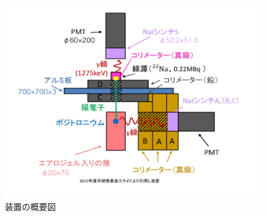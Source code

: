 \begin{figure}[H]
	\centering
		\includegraphics[width=15cm]{fig/isb/settings.pdf}
		\caption{装置の概要図}
		\label{fig:setting_dtl2015}
\end{figure}


